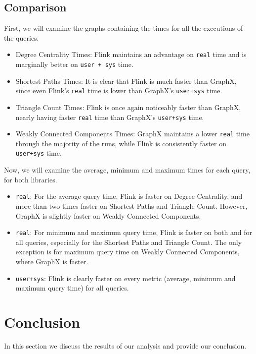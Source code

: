 \documentclass[conference]{IEEEtran}
\begin{document}
\subsection{Comparison}

First, we will examine the graphs containing the times for all the executions of the queries. 

\begin{itemize}
\item Degree Centrality Times: Flink maintains an advantage on \verb|real| time and is marginally better on \verb|user + sys| time. 

\item Shortest Paths Times: It is clear that Flink is much faster than GraphX, since even Flink's \verb|real| time is lower than GraphX's \verb|user+sys| time.

\item Triangle Count Times: Flink is once again noticeably faster than GraphX, nearly having faster \verb|real| time than GraphX's \verb|user+sys| time.

\item Weakly Connected Components Times: GraphX maintains a lower \verb|real| time through the majority of the runs, while Flink is consistently faster on \verb|user+sys| time.
\end{itemize}

Now, we will examine the average, minimum and maximum times for each query, for both libraries.

\begin{itemize}
\item \verb|real|: For the average query time, Flink is faster on Degree Centrality, and more than two times faster on Shortest Paths and Triangle Count. However, GraphX is slightly faster on Weakly Connected Components. 

\item \verb|real|: For minimum and maximum query time, Flink is faster on both and for all queries, especially for the Shortest Paths and Triangle Count. The only exception is for maximum query time on Weakly Connected Components, where GraphX is faster.

\item \verb|user+sys|: Flink is clearly faster on every metric (average, minimum and maximum query time) for all queries.
\end{itemize}


\section{\textbf{Conclusion}}\label{final}
In this section we discuss the results of our analysis and provide our conclusion.
\end{document}
